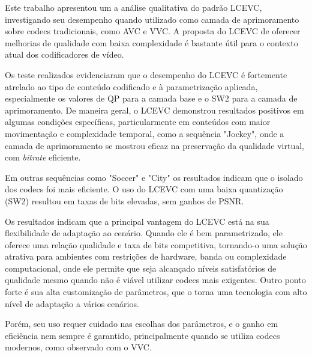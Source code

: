 Este trabalho apresentou um a análise qualitativa do padrão \acrfull{LCEVC},
investigando seu desempenho quando utilizado como camada de aprimoramento sobre
codecs tradicionais, como \acrshort{AVC} e \acrshort{VVC}. A proposta do 
\acrshort{LCEVC} de oferecer melhorias de qualidade com baixa complexidade
é bastante útil para o contexto atual dos codificadores de vídeo.

Os teste realizados evidenciaram que o desempenho do \acrshort{LCEVC} é 
fortemente atrelado ao tipo de conteúdo codificado e à parametrização
aplicada, especialmente os valores de QP para a camada base e o SW2
para a camada de aprimoramento. De maneira geral, o \acrshort{LCEVC}
demonstrou resultados positivos em algumas condições específicas,
particularmente em conteúdos com maior movimentação e complexidade
temporal, como a sequência "Jockey", onde a camada de aprimoramento
se mostrou eficaz na preservação da qualidade virtual, com \textit{bitrate}
eficiente.

Em outras sequências como "Soccer" e "City" os resultados indicam que
o isolado dos codecs foi mais eficiente. O uso do \acrshort{LCEVC} com
uma baixa quantização (SW2) resultou em taxas de bits elevadas, sem ganhos
de \acrshort{PSNR}.

Os resultados indicam que a principal vantagem do \acrshort{LCEVC} está
na sua flexibilidade de adaptação ao cenário. Quando ele é bem parametrizado,
ele oferece uma relação qualidade e taxa de bits competitiva, tornando-o uma
solução atrativa para ambientes com restrições de hardware, banda ou complexidade
computacional, onde ele permite que seja alcançado níveis satisfatórios de qualidade
mesmo quando não é viável utilizar codecs mais exigentes. Outro ponto forte é sua
alta customização de parâmetros, que o torna uma tecnologia com alto nível de
adaptação a vários cenários. 

Porém, seu uso requer cuidado nas escolhas dos parâmetros, e o ganho em eficiência nem sempre
é garantido, principalmente quando se utiliza codecs modernos, como observado
com o \acrshort{VVC}.